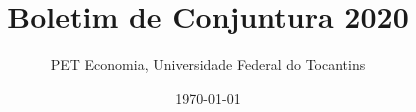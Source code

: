 

\title{Boletim de Conjuntura 2020}
\author{PET Economia, Universidade Federal do Tocantins}
\date{\today}



	\onecolumn

	
	
	

	

	
	

	\twocolumn


	
	
	
	
	
	

	


